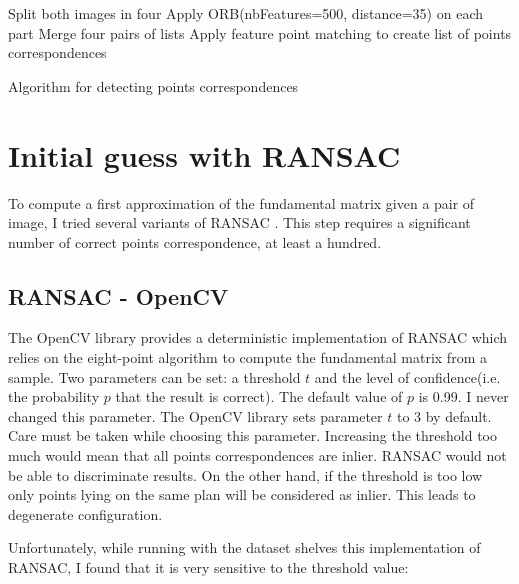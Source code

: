\documentclass[11pt]{report}
\begin{document}
\begin{algorithm}[H]
    Split both images in four\;
    Apply ORB(nbFeatures=500, distance=35) on each part\;
    Merge four pairs of lists\;
    Apply feature point matching to create list of points correspondences\;
  \caption{Algorithm for detecting points correspondences}
  \label{algo:points}
\end{algorithm}

\section{Initial guess with RANSAC}

To compute a first approximation of the fundamental matrix given a pair of image, I tried several variants of RANSAC \cite{Ransac81}. This step requires a significant number of correct points correspondence, at least a hundred.

\subsection{RANSAC - OpenCV}

The OpenCV library provides a deterministic implementation of RANSAC which relies on the eight-point algorithm to compute the fundamental matrix from a sample. Two parameters can be set: a threshold $t$ and the level of confidence(i.e. the probability $p$ that the result is correct). The default value of $p$ is 0.99. I never changed this parameter. The OpenCV library sets parameter $t$ to 3 by default. Care must be taken while choosing this parameter. Increasing the threshold too much would mean that all points correspondences are inlier. RANSAC would not be able to discriminate results. On the other hand, if the threshold is too low only points lying on the same plan will be considered as inlier. This leads to degenerate configuration.

Unfortunately, while running with the dataset shelves this implementation of RANSAC, I found that it is very sensitive to the threshold value:
\end{document}
